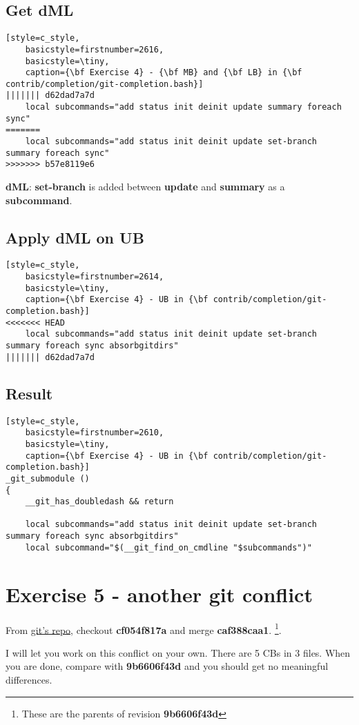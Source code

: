 \subsection*{Get {\bf dML}}
\begin{lstlisting}[style=c_style,
	basicstyle=firstnumber=2616,
	basicstyle=\tiny,
	caption={\bf Exercise 4} - {\bf MB} and {\bf LB} in {\bf contrib/completion/git-completion.bash}]
||||||| d62dad7a7d
	local subcommands="add status init deinit update summary foreach sync"
=======
	local subcommands="add status init deinit update set-branch summary foreach sync"
>>>>>>> b57e8119e6
\end{lstlisting}

{\bf dML}: {\bf set-branch} is added between {\bf update} and {\bf summary} as a {\bf subcommand}.

\subsection*{Apply {\bf dML} on {\bf UB}}
\begin{lstlisting}[style=c_style,
	basicstyle=firstnumber=2614,
	basicstyle=\tiny,
	caption={\bf Exercise 4} - UB in {\bf contrib/completion/git-completion.bash}]
<<<<<<< HEAD
	local subcommands="add status init deinit update set-branch summary foreach sync absorbgitdirs"
||||||| d62dad7a7d
\end{lstlisting}

\subsection*{Result}
\begin{lstlisting}[style=c_style,
	basicstyle=firstnumber=2610,
	basicstyle=\tiny,
	caption={\bf Exercise 4} - UB in {\bf contrib/completion/git-completion.bash}]
_git_submodule ()
{
	__git_has_doubledash && return

	local subcommands="add status init deinit update set-branch summary foreach sync absorbgitdirs"
	local subcommand="$(__git_find_on_cmdline "$subcommands")"
\end{lstlisting}


\section{Exercise 5 - another git conflict}
\label{exercise_05}
From \hyperref[git_repo]{git's repo}, checkout {\bf cf054f817a} and merge {\bf caf388caa1}.
\footnote{These are the parents of revision {\bf 9b6606f43d}}.

I will let you work on this conflict on your own. There are 5 CBs in 3 files. When you are done, compare
with {\bf 9b6606f43d} and you should get no meaningful differences.

